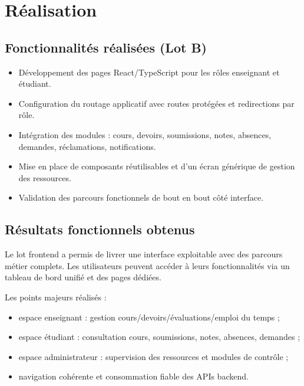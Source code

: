 \chapter{Réalisation}

\section{Fonctionnalités réalisées (Lot B)}
\begin{itemize}
  \item Développement des pages React/TypeScript pour les rôles enseignant et étudiant.
  \item Configuration du routage applicatif avec routes protégées et redirections par rôle.
  \item Intégration des modules : cours, devoirs, soumissions, notes, absences, demandes, réclamations, notifications.
  \item Mise en place de composants réutilisables et d'un écran générique de gestion des ressources.
  \item Validation des parcours fonctionnels de bout en bout côté interface.
\end{itemize}

\section{Résultats fonctionnels obtenus}
Le lot frontend a permis de livrer une interface exploitable avec des parcours métier complets. Les utilisateurs peuvent accéder à leurs fonctionnalités via un tableau de bord unifié et des pages dédiées.

Les points majeurs réalisés :
\begin{itemize}
  \item espace enseignant : gestion cours/devoirs/évaluations/emploi du temps ;
  \item espace étudiant : consultation cours, soumissions, notes, absences, demandes ;
  \item espace administrateur : supervision des ressources et modules de contrôle ;
  \item navigation cohérente et consommation fiable des APIs backend.
\end{itemize}

